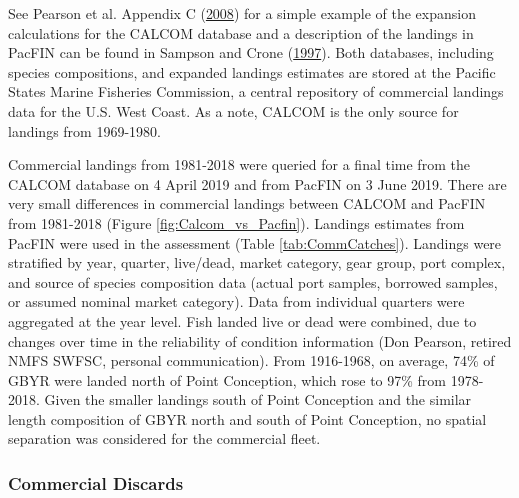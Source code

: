 \documentclass[12pt,]{article}
\begin{document}
See Pearson et al. Appendix C
(\protect\hyperlink{ref-Pearson2008}{2008}) for a simple example of the
expansion calculations for the CALCOM database and a description of the
landings in PacFIN can be found in Sampson and Crone
(\protect\hyperlink{ref-Sampson1997}{1997}). Both databases, including
species compositions, and expanded landings estimates are stored at the
Pacific States Marine Fisheries Commission, a central repository of
commercial landings data for the U.S. West Coast. As a note, CALCOM is
the only source for landings from 1969-1980.

Commercial landings from 1981-2018 were queried for a final time from
the CALCOM database on 4 April 2019 and from PacFIN on 3 June 2019.
There are very small differences in commercial landings between CALCOM
and PacFIN from 1981-2018 (Figure \ref{fig:Calcom_vs_Pacfin}). Landings
estimates from PacFIN were used in the assessment (Table
\ref{tab:CommCatches}). Landings were stratified by year, quarter,
live/dead, market category, gear group, port complex, and source of
species composition data (actual port samples, borrowed samples, or
assumed nominal market category). Data from individual quarters were
aggregated at the year level. Fish landed live or dead were combined,
due to changes over time in the reliability of condition information
(Don Pearson, retired NMFS SWFSC, personal communication). From
1916-1968, on average, 74\% of GBYR were landed north of Point
Conception, which rose to 97\% from 1978-2018. Given the smaller
landings south of Point Conception and the similar length composition of
GBYR north and south of Point Conception, no spatial separation was
considered for the commercial fleet.

\subsubsection{Commercial Discards}\label{commercial-discards}
\end{document}
